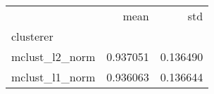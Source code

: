\begin{tabular}{lrr}
\toprule
{} &      mean &       std \\
clusterer      &           &           \\
\midrule
mclust\_l2\_norm &  0.937051 &  0.136490 \\
mclust\_l1\_norm &  0.936063 &  0.136644 \\
\bottomrule
\end{tabular}

